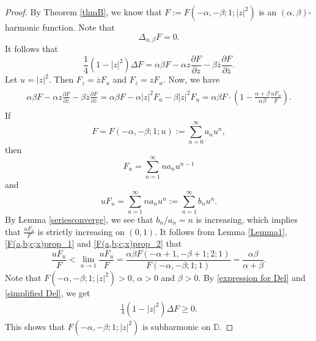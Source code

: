 \documentclass[11pt, reqno]{amsart}
\theoremstyle{definition}
\numberwithin{equation}{section}
\theoremstyle{remark}
\numberwithin{equation}{section}
\newcommand{\ID}{{\mathbb D}}
\begin{document}
\begin{proof}
	By Theorem \ref{thmB}, we know that $F:=F\left(-\alpha,-\beta;1;|z|^2\right)$ is an $(\alpha,\beta)$-harmonic  function. Note that $$\Delta_{\alpha,\beta} F = 0.$$ It follows that
	\begin{equation}\label{expression for Del}
		\frac{1}{4}\left(1-|z|^2\right)\Delta F=\alpha\beta F-\alpha z\frac{\partial F}{\partial z}-\beta\overline{z}\frac{\partial  F}{\partial \overline{z}}.
	\end{equation} 
	Let $u=|z|^2$. Then $F_z=\overline{z}F_u$ and $F_{\overline{z}}=zF_u.$ Now, we have
	\begin{align}
    \begin{split}\label{simplified Del}
		\alpha\beta F-\alpha z\frac{\partial F}{\partial z}-\beta\overline{z}\frac{\partial  F}{\partial \overline{z}}=\alpha\beta F-\alpha|z|^2F_u-\beta|z|^2F_u=\alpha\beta F\cdot\left(1-\frac{\alpha+\beta}{\alpha\beta}\frac{uF_u}{F}\right).
        \end{split}
	\end{align} 
	If $$F=F(-\alpha,-\beta;1;u):=\sum_{n=0}^\infty a_nu^n,$$ then $$F_u=\sum_{n=1}^\infty na_nu^{n-1}$$ and $$uF_u=\sum_{n=1}^\infty na_nu^n:=\sum_{n=1}^\infty b_nu^n.$$ By Lemma \ref{seriesconverge}, we see that $b_n/a_n=n$ is increasing, which implies that $\frac{uF_u}{F}$ is strictly increasing on $(0,1)$. It follows from Lemma \ref{Lemma1}, \eqref{F(a,b;c;x)prop_1} and \eqref{F(a,b;c;x)prop_2} that
	\begin{equation*}
		\frac{uF_u}{F}<\lim\limits_{u\rightarrow 1}\frac{uF_u}{F}=\frac{\alpha\beta F(-\alpha+1,-\beta+1;2;1)}{F(-\alpha,-\beta;1;1)}=\frac{\alpha\beta}{\alpha+\beta}.
	\end{equation*}
Note that  $F\left(-\alpha,-\beta;1;|z|^2\right)>0$, $\alpha>0$ and $\beta>0$. By \eqref{expression for Del} and \eqref{simplified Del}, we get
	\begin{eqnarray*}
		\frac{1}{4}\left(1-|z|^2\right)\Delta F\geq 0.
	\end{eqnarray*}
	This shows that $F\left(-\alpha,-\beta;1;|z|^2\right)$ is subharmonic on $\ID$.%
\end{proof}
\end{document}
